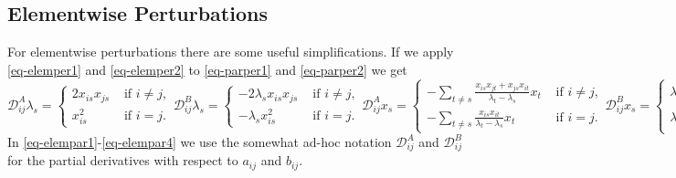 \documentclass[
  12pt,
  letterpaper,
  DIV=11,
  numbers=noendperiod]{scrartcl}
\begin{document}
\subsection{Elementwise Perturbations}\label{sec-parelementwise}

For elementwise perturbations there are some useful simplifications. If
we apply \eqref{eq-elemper1} and \eqref{eq-elemper2} to
\eqref{eq-parper1} and \eqref{eq-parper2} we get \begin{subequations}
\begin{equation}
\mathcal{D}_{ij}^A\lambda_s=\begin{cases}2x_{is}x_{js}&\text{ if }i\not= j,\\
x_{is}^2&\text{ if }i=j.
\end{cases}\label{eq-elempar1}
\end{equation}
\begin{equation}
\mathcal{D}_{ij}^B\lambda_s=\begin{cases}-2\lambda_sx_{is}x_{js}&\text{ if }i\not= j,\\
-\lambda_sx_{is}^2&\text{ if }i=j.
\end{cases}
\end{equation}\label{eq-elempar2}
\begin{equation}
\mathcal{D}_{ij}^Ax_s=
\begin{cases}
-\sum_{t\not= s}\frac{x_{is}x_{jt}+x_{js}x_{it}}{\lambda_t-\lambda_s}x_t&\text{ if }i\not= j,\\
-\sum_{t\not= s}\frac{x_{is}x_{it}}{\lambda_t-\lambda_s}x_t&\text{ if }i=j.
\end{cases}\label{eq-elempar3}
\end{equation}
\begin{equation}
\mathcal{D}_{ij}^Bx_s=
\begin{cases}
\lambda_s\sum_{t\not= s}\frac{x_{is}x_{jt}+x_{js}x_{it}}{\lambda_t-\lambda_s}x_t-x_{is}x_{js}x_s&\text{ if }i\not= j,\\
\lambda_s\sum_{t\not= s}\frac{x_{is}x_{it}}{\lambda_t-\lambda_s}x_t-\frac12x_{is}^2x_s&\text{ if }i=j.
\end{cases}\label{eq-elempar4}
\end{equation}
\end{subequations} In \eqref{eq-elempar1}-\eqref{eq-elempar4} we use the
somewhat ad-hoc notation \(\mathcal{D}_{ij}^A\) and
\(\mathcal{D}_{ij}^B\) for the partial derivatives with respect to
\(a_{ij}\) and \(b_{ij}\).
\end{document}
